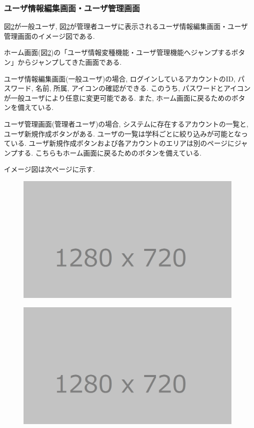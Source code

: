 \documentclass[11ptm]{jsarticle}
\begin{document}
\subsubsection{ユーザ情報編集画面・ユーザ管理画面}
\label{sec:ユーザ情報編集画面・ユーザ管理画面}
図\ref{fig:}が一般ユーザ, 図\ref{fig:}が管理者ユーザに表示されるユーザ情報編集画面・ユーザ管理画面のイメージ図である. \par
ホーム画面(図\ref{fig:})の「ユーザ情報変種機能・ユーザ管理機能へジャンプするボタン」からジャンプしてきた画面である. \par
ユーザ情報編集画面(一般ユーザ)の場合, ログインしているアカウントのID, パスワード, 名前, 所属, アイコンの確認ができる. このうち, パスワードとアイコンが一般ユーザにより任意に変更可能である. また, ホーム画面に戻るためのボタンを備えている. \par
ユーザ管理画面(管理者ユーザ)の場合, システムに存在するアカウントの一覧と, ユーザ新規作成ボタンがある. ユーザの一覧は学科ごとに絞り込みが可能となっている. ユーザ新規作成ボタンおよび各アカウントのエリアは別のページにジャンプする. こちらもホーム画面に戻るためのボタンを備えている. \par
イメージ図は次ページに示す.
\clearpage
\begin{figure}[h]
  \centering
  \includegraphics[keepaspectratio, width=0.8\linewidth]{source/tmp_picture.png}
  \caption{\label{fig:}}
\end{figure}
\begin{figure}[h]
  \centering
  \includegraphics[keepaspectratio, width=0.8\linewidth]{source/tmp_picture.png}
  \caption{\label{fig:}}
\end{figure}
\end{document}
